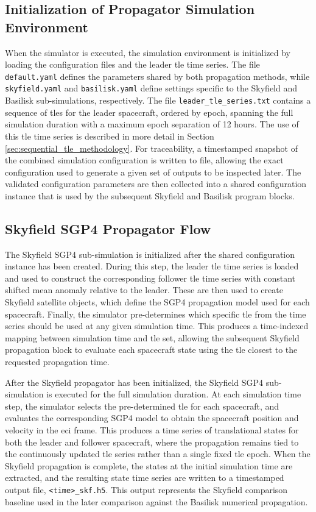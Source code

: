 \subsection{Initialization of Propagator Simulation Environment}
\label{sec:propagator_init}
When the simulator is executed, the simulation environment is initialized by loading the configuration files and the leader \gls{tle} time series. The file \texttt{default.yaml} defines the parameters shared by both propagation methods, while \texttt{skyfield.yaml} and \texttt{basilisk.yaml} define settings specific to the Skyfield and Basilisk sub-simulations, respectively. The file \texttt{leader\_tle\_series.txt} contains a sequence of \gls{tle}s for the leader spacecraft, ordered by epoch, spanning the full simulation duration with a maximum epoch separation of 12 hours. The use of this \gls{tle} time series is described in more detail in Section \ref{sec:sequential_tle_methodology}. For traceability, a timestamped snapshot of the combined simulation configuration is written to file, allowing the exact configuration used to generate a given set of outputs to be inspected later. The validated configuration parameters are then collected into a shared configuration instance that is used by the subsequent Skyfield and Basilisk program blocks.


\subsection{Skyfield SGP4 Propagator Flow}
The Skyfield SGP4 sub-simulation is initialized after the shared configuration instance has been created. During this step, the leader \gls{tle} time series is loaded and used to construct the corresponding follower \gls{tle} time series with constant shifted mean anomaly relative to the leader. These are then used to create Skyfield satellite objects, which define the SGP4 propagation model used for each spacecraft. Finally, the simulator pre-determines which specific \gls{tle} from the time series should be used at any given simulation time. This produces a time-indexed mapping between simulation time and \gls{tle} set, allowing the subsequent Skyfield propagation block to evaluate each spacecraft state using the \gls{tle} closest to the requested propagation time.


After the Skyfield propagator has been initialized, the Skyfield SGP4 sub-simulation is executed for the full simulation duration. At each simulation time step, the simulator selects the pre-determined \gls{tle} for each spacecraft, and evaluates the corresponding SGP4 model to obtain the spacecraft position and velocity in the \gls{eci} frame. This produces a time series of translational states for both the leader and follower spacecraft, where the propagation remains tied to the continuously updated \gls{tle} series rather than a single fixed \gls{tle} epoch. When the Skyfield propagation is complete, the states at the initial simulation time are extracted, and the resulting state time series are written to a timestamped output file, \texttt{<time>\_skf.h5}. This output represents the Skyfield comparison baseline used in the later comparison against the Basilisk numerical propagation.


